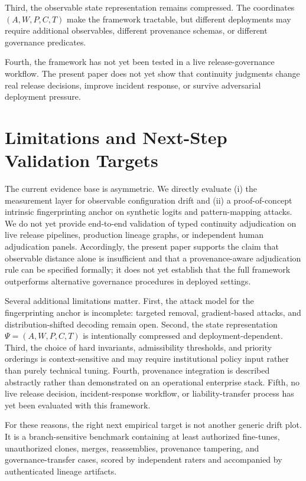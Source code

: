 \documentclass[11pt,a4paper]{article}
\begin{document}
Third, the observable state representation remains compressed. The coordinates \((A,W,P,C,T)\) make the framework tractable, but different deployments may require additional observables, different provenance schemas, or different governance predicates.

Fourth, the framework has not yet been tested in a live release-governance workflow. The present paper does not yet show that continuity judgments change real release decisions, improve incident response, or survive adversarial deployment pressure.

\section{Limitations and Next-Step Validation Targets}
The current evidence base is asymmetric. We directly evaluate (i) the measurement layer for observable configuration drift and (ii) a proof-of-concept intrinsic fingerprinting anchor on synthetic logits and pattern-mapping attacks. We do not yet provide end-to-end validation of typed continuity adjudication on live release pipelines, production lineage graphs, or independent human adjudication panels. Accordingly, the present paper supports the claim that observable distance alone is insufficient and that a provenance-aware adjudication rule can be specified formally; it does not yet establish that the full framework outperforms alternative governance procedures in deployed settings.

Several additional limitations matter. First, the attack model for the fingerprinting anchor is incomplete: targeted removal, gradient-based attacks, and distribution-shifted decoding remain open. Second, the state representation \(\Psi=(A,W,P,C,T)\) is intentionally compressed and deployment-dependent. Third, the choice of hard invariants, admissibility thresholds, and priority orderings is context-sensitive and may require institutional policy input rather than purely technical tuning. Fourth, provenance integration is described abstractly rather than demonstrated on an operational enterprise stack. Fifth, no live release decision, incident-response workflow, or liability-transfer process has yet been evaluated with this framework.

For these reasons, the right next empirical target is not another generic drift plot. It is a branch-sensitive benchmark containing at least authorized fine-tunes, unauthorized clones, merges, reassemblies, provenance tampering, and governance-transfer cases, scored by independent raters and accompanied by authenticated lineage artifacts.
\end{document}
